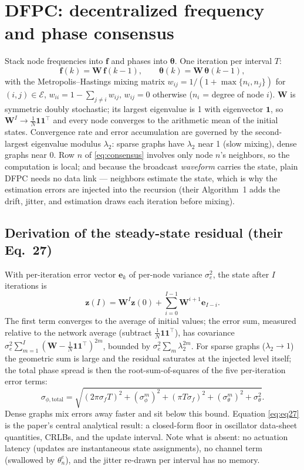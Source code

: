 \documentclass[10pt]{article}
\begin{document}
\section{DFPC: decentralized frequency and phase consensus}
Stack node frequencies into $\mathbf f$ and phases into
$\boldsymbol\theta$. One iteration per interval $T$:
\begin{equation}
\mathbf f(k)=\mathbf W\,\mathbf f(k{-}1),\qquad
\boldsymbol\theta(k)=\mathbf W\,\boldsymbol\theta(k{-}1),
\label{eq:consensus}
\end{equation}
with the Metropolis--Hastings mixing matrix
$w_{ij}=1/(1+\max\{n_i,n_j\})$ for $(i,j)\in\mathcal E$,
$w_{ii}=1-\sum_{j\ne i}w_{ij}$, $w_{ij}=0$ otherwise ($n_i$ = degree of
node $i$). $\mathbf W$ is symmetric doubly stochastic; its largest
eigenvalue is 1 with eigenvector $\mathbf 1$, so $\mathbf W^{I}\to
\tfrac1N\mathbf{11}^\top$ and every node converges to the arithmetic
mean of the initial states. Convergence rate and error accumulation are
governed by the second-largest eigenvalue modulus $\lambda_2$: sparse
graphs have $\lambda_2$ near 1 (slow mixing), dense graphs near 0. Row
$n$ of \eqref{eq:consensus} involves only node $n$'s neighbors, so the
computation is local; and because the broadcast \emph{waveform} carries
the state, plain DFPC needs no data link --- neighbors estimate the
state, which is why the estimation errors are injected into the
recursion (their Algorithm~1 adds the drift, jitter, and estimation
draws each iteration before mixing).

\subsection{Derivation of the steady-state residual (their Eq.~27)}
With per-iteration error vector $\mathbf e_k$ of per-node variance
$\sigma_e^2$, the state after $I$ iterations is
\begin{equation}
\mathbf z(I)=\mathbf W^{I}\mathbf z(0)+\sum_{i=0}^{I-1}\mathbf W^{i+1}
\mathbf e_{I-i}.
\end{equation}
The first term converges to the average of initial values; the error sum,
measured relative to the network average (subtract
$\tfrac1N\mathbf{11}^\top$), has covariance
$\sigma_e^2\sum_{m=1}^{I}(\mathbf W-\tfrac1N\mathbf{11}^\top)^{2m}$,
bounded by $\sigma_e^2\sum_m\lambda_2^{2m}$. For sparse graphs
($\lambda_2\to1$) the geometric sum is large and the residual saturates
at the injected level itself; the total phase spread is then the
root-sum-of-squares of the five per-iteration error terms:
\begin{equation}
\sigma_{\phi,\mathrm{total}}
=\sqrt{(2\pi\sigma_fT)^2+(\sigma^m_\phi)^2+(\pi T\sigma_f)^2
+(\sigma^m_\theta)^2+\sigma_\theta^2}.
\label{eq:eq27}
\end{equation}
Dense graphs mix errors away faster and sit below this bound. Equation
\eqref{eq:eq27} is the paper's central analytical result: a closed-form
floor in oscillator data-sheet quantities, CRLBs, and the update
interval. Note what is absent: no actuation latency (updates are
instantaneous state assignments), no channel term (swallowed by
$\theta^e_n$), and the jitter re-drawn per interval has no memory.
\end{document}
